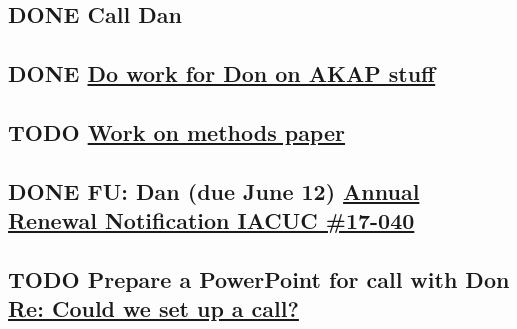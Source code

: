 \documentclass[11pt]{article}
\begin{document}
\subsection{{\bfseries\sffamily DONE} Call Dan}
\label{sec:org85b05c3}
\subsection{{\bfseries\sffamily DONE} \href{//\%3c172ACE66-BF7C-48F6-908D-1589C1209E4B@rush.edu\%3E}{Do work for Don on AKAP stuff}}
\label{sec:org3b104eb}
\subsection{{\bfseries\sffamily TODO} \href{//\%3c172ACE66-BF7C-48F6-908D-1589C1209E4B@rush.edu\%3E}{Work on methods paper}}
\label{sec:org9e5728e}
\subsection{{\bfseries\sffamily DONE} FU: Dan (due June 12) \href{//\%3cc6ef34a6c1ed42aa9d2062694f0be929@RUPW-EXCHMAIL01.rush.edu\%3E}{Annual Renewal Notification IACUC \#17-040}}
\label{sec:org2dd1ec8}

\subsection{{\bfseries\sffamily TODO} Prepare a PowerPoint for call with Don \href{//\%3c61415DB3-D295-4CE7-BC84-5CED3BABF338@rush.edu\%3E}{Re: Could we set up a call?}}
\label{sec:org4a56131}
\end{document}
